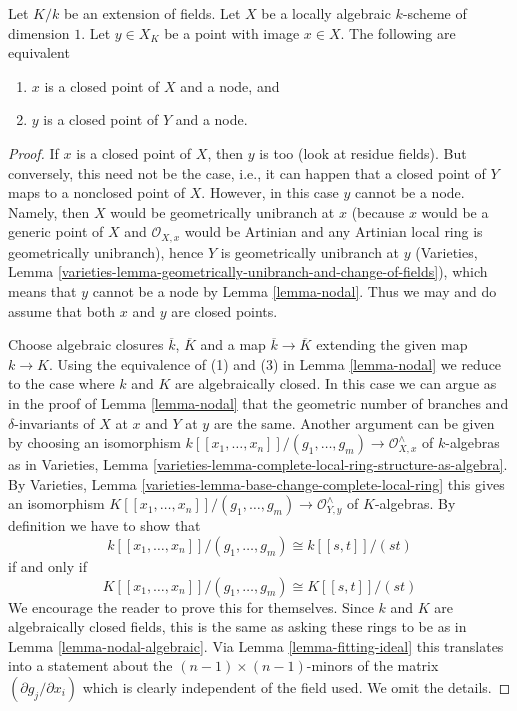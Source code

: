 \begin{lemma}
\label{lemma-node-field-extension}
Let $K/k$ be an extension of fields. Let $X$ be a locally algebraic
$k$-scheme of dimension $1$. Let $y \in X_K$ be a point with image
$x \in X$. The following are equivalent
\begin{enumerate}
\item $x$ is a closed point of $X$ and a node, and
\item $y$ is a closed point of $Y$ and a node.
\end{enumerate}
\end{lemma}

\begin{proof}
If $x$ is a closed point of $X$, then $y$ is too (look at residue fields).
But conversely, this need not be the case, i.e., it can happen that a
closed point of $Y$ maps to a nonclosed point of $X$. However, in this
case $y$ cannot be a node. Namely, then $X$ would be geometrically
unibranch at $x$ (because $x$ would be a generic point of $X$ and
$\mathcal{O}_{X, x}$ would be Artinian and any Artinian local ring is
geometrically unibranch), hence $Y$ is geometrically unibranch at $y$
(Varieties, Lemma
\ref{varieties-lemma-geometrically-unibranch-and-change-of-fields}),
which means that $y$ cannot be a node by Lemma \ref{lemma-nodal}.
Thus we may and do assume that both $x$ and $y$ are closed points.

\medskip\noindent
Choose algebraic closures $\overline{k}$, $\overline{K}$
and a map $\overline{k} \to \overline{K}$ extending the
given map $k \to K$. Using the equivalence of (1) and (3)
in Lemma \ref{lemma-nodal}
we reduce to the case where $k$ and $K$ are algebraically closed.
In this case we can argue as in the proof of
Lemma \ref{lemma-nodal} that the geometric number of branches
and $\delta$-invariants of $X$ at $x$ and $Y$ at $y$ are the same.
Another argument can be given by choosing an isomorphism
$k[[x_1, \ldots, x_n]]/(g_1, \ldots, g_m) \to \mathcal{O}_{X, x}^\wedge$
of $k$-algebras as in Varieties, Lemma
\ref{varieties-lemma-complete-local-ring-structure-as-algebra}.
By Varieties, Lemma \ref{varieties-lemma-base-change-complete-local-ring}
this gives an isomorphism
$K[[x_1, \ldots, x_n]]/(g_1, \ldots, g_m) \to \mathcal{O}_{Y, y}^\wedge$
of $K$-algebras. By definition we have to show that
$$
k[[x_1, \ldots, x_n]]/(g_1, \ldots, g_m) \cong k[[s, t]]/(st)
$$
if and only if
$$
K[[x_1, \ldots, x_n]]/(g_1, \ldots, g_m) \cong K[[s, t]]/(st)
$$
We encourage the reader to prove this for themselves.
Since $k$ and $K$ are algebraically closed fields, this is the same as
asking these rings to be as in Lemma \ref{lemma-nodal-algebraic}.
Via Lemma \ref{lemma-fitting-ideal} this translates into a statement
about the $(n - 1) \times (n - 1)$-minors of the matrix
$(\partial g_j/\partial x_i)$ which is clearly independent of the
field used. We omit the details.
\end{proof}

